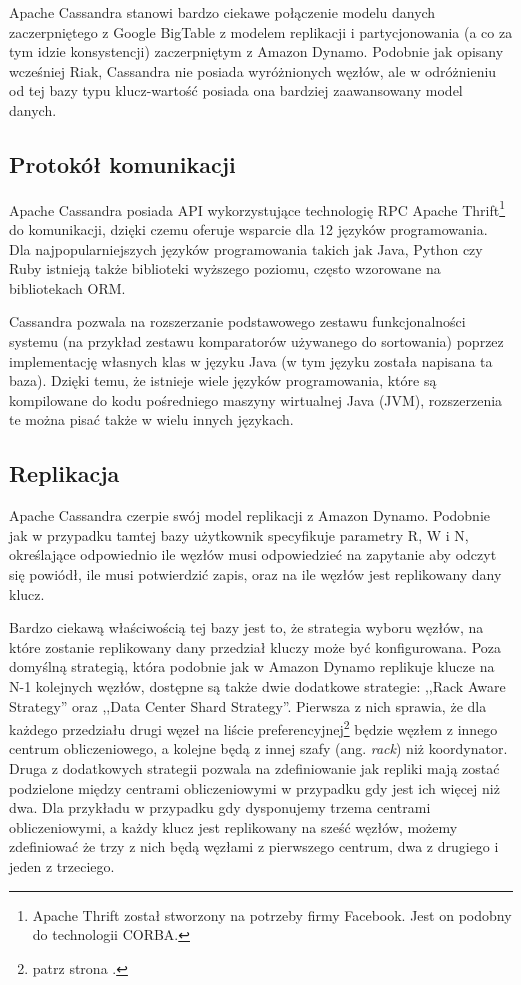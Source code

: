 Apache Cassandra stanowi bardzo ciekawe połączenie modelu danych zaczerpniętego z Google BigTable z modelem replikacji i partycjonowania (a co za tym idzie konsystencji) zaczerpniętym z Amazon Dynamo.
Podobnie jak opisany wcześniej Riak, Cassandra nie posiada wyróżnionych węzłów, ale w odróżnieniu od tej bazy typu klucz-wartość posiada ona bardziej zaawansowany model danych.

\subsection*{Protokół komunikacji}

Apache Cassandra posiada API wykorzystujące technologię RPC Apache Thrift\footnote{Apache Thrift został stworzony na potrzeby firmy Facebook. Jest on podobny do technologii CORBA.} do komunikacji, dzięki czemu oferuje wsparcie dla 12 języków programowania.
Dla najpopularniejszych języków programowania takich jak Java, Python czy Ruby istnieją także biblioteki wyższego poziomu, często wzorowane na bibliotekach ORM.

Cassandra pozwala na rozszerzanie podstawowego zestawu funkcjonalności systemu (na przykład zestawu komparatorów używanego do sortowania) poprzez implementację własnych klas w języku Java (w tym języku została napisana ta baza).
Dzięki temu, że istnieje wiele języków programowania, które są kompilowane do kodu pośredniego maszyny wirtualnej Java (JVM), rozszerzenia te można pisać także w wielu innych językach.

\subsection*{Replikacja}

Apache Cassandra czerpie swój model replikacji z Amazon Dynamo.
Podobnie jak w przypadku tamtej bazy użytkownik specyfikuje parametry R, W i N, określające odpowiednio ile węzłów musi odpowiedzieć na zapytanie aby odczyt się powiódł, ile musi potwierdzić zapis, oraz na ile węzłów jest replikowany dany klucz.

Bardzo ciekawą właściwością tej bazy jest to, że strategia wyboru węzłów, na które zostanie replikowany dany przedział kluczy może być konfigurowana.
Poza domyślną strategią, która podobnie jak w Amazon Dynamo replikuje klucze na N-1 kolejnych węzłów, dostępne są także dwie dodatkowe strategie: ,,Rack Aware Strategy'' oraz ,,Data Center Shard Strategy''.
Pierwsza z nich sprawia, że dla każdego przedziału drugi węzeł na liście preferencyjnej\footnote{patrz strona \pageref{sec:dynamo-replikacja}.} będzie węzłem z innego centrum obliczeniowego, a kolejne będą z innej szafy (ang. \emph{rack}) niż koordynator.
Druga z dodatkowych strategii pozwala na zdefiniowanie jak repliki mają zostać podzielone między centrami obliczeniowymi w przypadku gdy jest ich więcej niż dwa.
Dla przykładu w przypadku gdy dysponujemy trzema centrami obliczeniowymi, a każdy klucz jest replikowany na sześć węzłów, możemy zdefiniować że trzy z nich będą węzłami z pierwszego centrum, dwa z drugiego i jeden z trzeciego.

